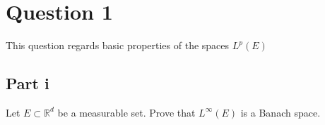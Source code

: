 \section{Question 1}

\begin{question}
    This question regards basic properties of the spaces $L^p(E)$
\end{question}

\subsection{Part i}

\begin{question}
    Let $E \subset \mathbb{R}^d$ be a measurable set. Prove that $L^{\infty}(E)$ is a Banach space.
\end{question}

